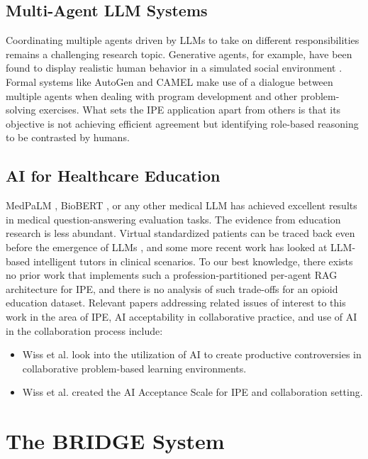 \documentclass[pdflatex,sn-mathphys-num]{sn-jnl}
\theoremstyle{thmstyleone}
\theoremstyle{thmstyletwo}
\theoremstyle{thmstylethree}
\begin{document}
\subsection{Multi-Agent LLM Systems}

Coordinating multiple agents driven by LLMs to take on different responsibilities remains a challenging research topic. Generative agents, for example, have been found to display realistic human behavior in a simulated social environment \cite{park2023generative}. Formal systems like AutoGen \cite{wu2023autogen} and CAMEL \cite{li2023camel} make use of a dialogue between multiple agents when dealing with program development and other problem-solving exercises. What sets the IPE application apart from others is that its objective is not achieving efficient agreement but identifying role-based reasoning to be contrasted by humans.

\subsection{AI for Healthcare Education}

MedPaLM \cite{singhal2023medpalm}, BioBERT \cite{lee2020biobert}, or any other medical LLM has achieved excellent results in medical question-answering evaluation tasks. The evidence from education research is less abundant. Virtual standardized patients can be traced back even before the emergence of LLMs \cite{stevens2006virtual}, and some more recent work has looked at LLM-based intelligent tutors in clinical scenarios. To our best knowledge, there exists no prior work that implements such a profession-partitioned per-agent RAG architecture for IPE, and there is no analysis of such trade-offs for an opioid education dataset. Relevant
papers addressing related issues of interest to this work in the area of IPE, AI acceptability in collaborative practice, and use of AI in the collaboration process include:

\begin{itemize}
    \item Wiss et al. \cite{wiss2025groupthink} look into the utilization of AI to create productive controversies in collaborative problem-based learning environments.
    \item Wiss et al. \cite{wiss2025aaipe} created the AI Acceptance Scale for IPE and collaboration setting.
\end{itemize}

\section{The BRIDGE System}\label{sec:bridge}
\end{document}
